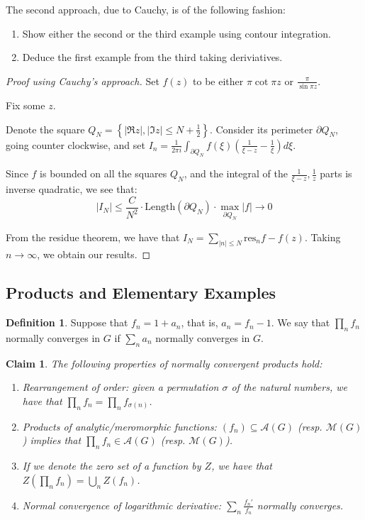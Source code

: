 \documentclass[11pt]{article} %
\newtheorem{claim}[theorem]{Claim}
\theoremstyle{definition}
\newtheorem{definition}[theorem]{Definition}
\theoremstyle{remark}
\newcommand{\abs}[1]{\left|#1\right|}
\newcommand{\res}{\text{res}}
\begin{document}
The second approach, due to Cauchy, is of the following fashion:

\begin{enumerate}
\item Show either the second or the third example using contour integration.
\item Deduce the first example from the third taking deriviatives.
\end{enumerate}

\begin{proof}[Proof using Cauchy's approach]

Set $f\left(z\right)$ to be either $\pi \cot \pi z$ or $\frac{\pi}{\sin \pi z}$.

Fix some $z$.

Denote the square $Q_N = \left\{\abs{\Re z}, \abs{\Im z} \leq N + \frac{1}{2} \right\}$. Consider its perimeter $\partial Q_N$, going counter clockwise, and set $I_n = \frac{1}{2\pi i}\int_{\partial Q_N} f\left(\xi\right)\left(\frac{1}{\xi - z} - \frac{1}{\xi}\right)d \xi$.

Since $f$ is bounded on all the squares $Q_N$, and the integral of the $\frac{1}{\xi -z}, \frac{1}{z}$ parts is inverse quadratic, we see that:
\[ \abs{I_N} \leq \frac{C}{N^2} \cdot\text{Length} \left(\partial Q_N \right) \cdot \max_{\partial Q_N} \abs{f} \to 0\]

From the residue theorem, we have that $I_N = \sum_{\abs{n} \leq N} \res_n f - f\left(z\right)$. Taking $n \to \infty$, we obtain our results.
\end{proof}

\subsection{Products and Elementary Examples}

\begin{definition}
Suppose that $f_n = 1 + a_n$, that is, $a_n = f_n - 1$. We say that $\prod_n f_n$ normally converges in $G$ if $\sum _n a_n$ normally converges in $G$.    
\end{definition}

\begin{claim}
The following properties of normally convergent products hold:

\begin{enumerate}
\item Rearrangement of order: given a permutation $\sigma$ of the natural numbers, we have that $\prod_n f_n = \prod_n f_{\sigma\left(n\right)}$.
\item Products of analytic/meromorphic functions: $\left(f_n\right) \subseteq \mathcal{A}\left(G\right)$ (resp. $\mathcal{M}\left(G\right)$) implies that $\prod_n f_n \in \mathcal{A}\left(G\right)$ (resp. $\mathcal{M}\left(G\right)$).
\item If we denote the zero set of a function by $Z$, we have that $Z\left(\prod_n f_n\right) = \bigcup_n Z\left(f_n\right)$.
\item Normal convergence of logarithmic derivative: $\sum_n \frac{f_n'}{f_n}$ normally converges.
\end{enumerate}
\end{claim}
\end{document}
